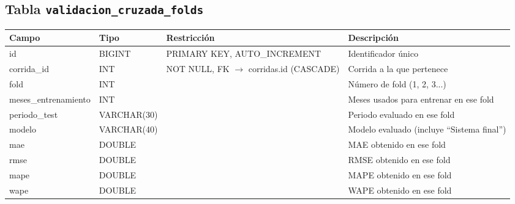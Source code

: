 \subsection*{Tabla \texttt{validacion\_cruzada\_folds}}
\begin{table}[H]
\centering
\renewcommand{\arraystretch}{1.3}
\begin{tabularx}{\textwidth}{|>{\raggedright\arraybackslash}p{3.0cm}|l|>{\raggedright\arraybackslash}p{3.2cm}|X|}
\hline
\textbf{Campo} & \textbf{Tipo} & \textbf{Restricción} & \textbf{Descripción} \\
\hline
id & BIGINT & PRIMARY KEY, AUTO\_\discretionary{}{}{}INCREMENT & Identificador único \\
\hline
corrida\_\discretionary{}{}{}id & INT & NOT NULL, FK $\to$ corridas.id (CASCADE) & Corrida a la que pertenece \\
\hline
fold & INT & & Número de fold (1, 2, 3...) \\
\hline
meses\_\discretionary{}{}{}entrenamiento & INT & & Meses usados para entrenar en ese fold \\
\hline
periodo\_\discretionary{}{}{}test & VARCHAR(30) & & Periodo evaluado en ese fold \\
\hline
modelo & VARCHAR(40) & & Modelo evaluado (incluye ``Sistema final'') \\
\hline
mae & DOUBLE & & MAE obtenido en ese fold \\
\hline
rmse & DOUBLE & & RMSE obtenido en ese fold \\
\hline
mape & DOUBLE & & MAPE obtenido en ese fold \\
\hline
wape & DOUBLE & & WAPE obtenido en ese fold \\
\hline
\end{tabularx}
\end{table}

